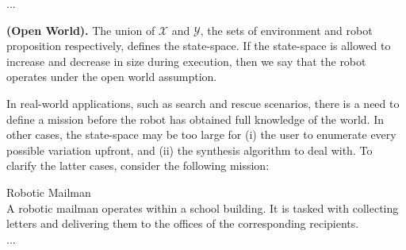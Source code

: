 ...

\begin{myDefinition}
	\textbf{(Open World).} The union of $\mathcal{X}$ and $\mathcal{Y}$, the sets of environment and robot proposition respectively, defines the state-space. If the state-space is allowed to increase and decrease in size during execution, then we say that the robot operates under the open world assumption.
\end{myDefinition}

In real-world applications, such as search and rescue scenarios, there is a need to define a mission before the robot has obtained full knowledge of the world. In other cases, the state-space may be too large for (i) the user to enumerate every possible variation upfront, and (ii) the synthesis algorithm to deal with. To clarify the latter cases, consider the following mission:

\begin{myExample}\label{Ex:mission1} Robotic Mailman\\
	A robotic mailman operates within a school building. It is tasked with collecting letters and delivering them to the offices of the corresponding recipients.\\
	
	...
\end{myExample}